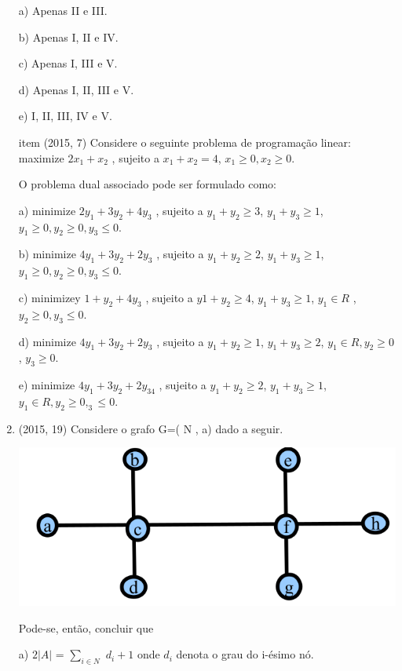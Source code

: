 \documentclass{article}
\begin{document}
\begin{enumerate}
a) Apenas II e III.

b) Apenas I, II e IV.

c) Apenas I, III e V.

d) Apenas I, II, III e V.

e) I, II, III, IV e V.


item (2015, 7) Considere o seguinte problema de programação linear: maximize $2 x_1 +x_2$ , sujeito a $x_1 + x_2 =4$, $x_1 \geq 0, x_2 \geq 0.$

O problema dual associado pode ser formulado como:\newline

a) minimize $2 y_1 + 3 y_2 +4 y_3$ , sujeito a $y_1 + y_2 \geq 3$, $y_1 + y_3 \geq 1$, $y_1 \geq 0, y_2 \geq 0, y_3 \leq 0.$

b) minimize $4 y_1 + 3 y_2 +2 y_3$ , sujeito a $y_1 + y_2 \geq 2$, $y_1 + y_3 \geq 1$, $y_1 \geq 0, y_2 \geq 0, y_3 \leq 0.$

c) minimizey $1 + y_2 +4 y_3$ , sujeito a $y 1 + y_2 \geq 4$, $y_1 + y_3 \geq 1$, $y_1 \in R$ , $y_2 \geq 0, y_3 \leq 0.$

d) minimize $4 y_1 + 3 y_2 +2 y_3$ , sujeito a $y_1 + y_2 \geq 1$, $y_1 + y_3 \geq 2$, $y_1 \in R , y_2 \geq 0$, $y_3 \geq 0.$

e) minimize $4 y_1 + 3 y_2 +2 y_34$ , sujeito a $y_1 + y_2 \geq 2$, $y_1 + y_3 \geq 1$, $y_1 \in R , y_2 \geq 0, _3 \leq 0$.\newline





\item (2015, 19) Considere o grafo G=( N , a) dado a seguir.\newline

\includegraphics[width=10 cm]{19-2015.png}\newline

Pode-se, então, concluir que\newline

a) $2|A|$ = $\sum_{i \in N}$ $d_i +1$ onde $d_i$ denota o grau do i-ésimo nó.


\end{enumerate}
\end{document}
